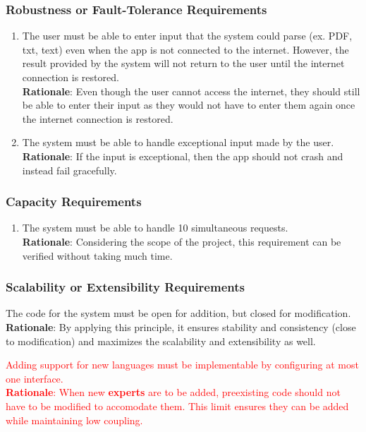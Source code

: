 \subsubsection{Robustness or Fault-Tolerance Requirements}
\label{ssub:robustness_or_fault_tolerance_requirements}
\begin{enumerate}[{PR-RFT}1. ]
	\item The user must be able to enter input that the system could parse (ex. PDF, txt, text) even when the app is not connected to the internet. However, the result provided by the system will not return to the user until the internet connection is restored.
	\\ \textbf{Rationale}: Even though the user cannot access the internet, they should still be able to enter their input as they would not have to enter them again once the internet connection is restored.
	\item The system must be able to handle exceptional input made by the user.
	\\ \textbf{Rationale}: If the input is exceptional, then the app should not crash and instead fail gracefully.
\end{enumerate}

\subsubsection{Capacity Requirements}
\label{ssub:capacity_requirements}
\begin{enumerate}[{PR-C}1. ]
	\item The system must be able to handle 10 simultaneous requests.
	\\ \textbf{Rationale}: Considering the scope of the project, this requirement can be verified without taking much time.	
\end{enumerate}

\subsubsection{Scalability or Extensibility Requirements}
\label{ssub:scalability_or_extensibility_requirements}
\begin{enumerate}[{PR-SE}1. ]
	\item The code for the system must be open for addition, but closed for modification.
	\\ \textbf{Rationale}: By applying this principle, it ensures stability and consistency (close to modification) and maximizes the scalability and extensibility as well.
	\textcolor{red}{\item Adding support for new languages must be implementable by configuring at most one interface.
	\\ \textbf{Rationale}: When new \textbf{experts} are to be added, preexisting code should not have to be modified to accomodate them. This limit ensures they can be added while maintaining low coupling.}
\end{enumerate}

